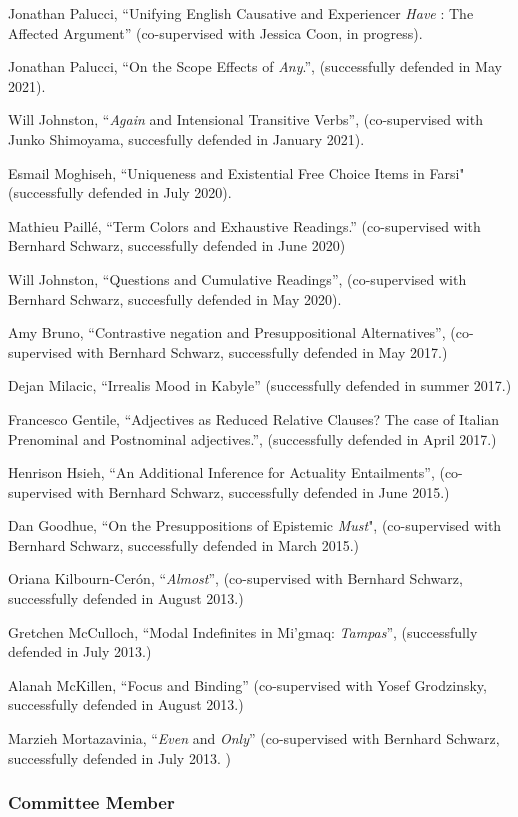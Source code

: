\documentclass[11pt]{article}
\begin{document}
Jonathan Palucci, ``Unifying English Causative and Experiencer \textit{Have} : The Affected Argument'' (co-supervised with Jessica Coon, in progress).

Jonathan Palucci, ``On the Scope Effects of \textit{Any}.'', (successfully defended in May 2021).

Will Johnston, ``\textit{Again} and Intensional Transitive Verbs'', (co-supervised with Junko Shimoyama, succesfully defended in January 2021).

Esmail Moghiseh, ``Uniqueness and Existential Free Choice Items in Farsi" (successfully defended in July 2020).

Mathieu Paill\'e, ``Term Colors and Exhaustive Readings.'' (co-supervised with Bernhard Schwarz, successfully defended in June 2020)

Will Johnston, ``Questions and Cumulative Readings'', (co-supervised with Bernhard Schwarz, succesfully defended in May 2020).

Amy Bruno, ``Contrastive negation and Presuppositional Alternatives'', (co-supervised with Bernhard Schwarz, successfully defended in May 2017.)

Dejan Milacic, ``Irrealis Mood in Kabyle'' (successfully defended in summer 2017.)

Francesco Gentile, ``Adjectives as Reduced Relative Clauses?
The case of Italian Prenominal and Postnominal adjectives.'', (successfully defended in April  2017.)

Henrison Hsieh, ``An Additional Inference for Actuality Entailments'',
(co-supervised with Bernhard Schwarz, successfully defended in June 2015.)

Dan Goodhue, ``On the Presuppositions of Epistemic \textit{Must}", (co-supervised with Bernhard Schwarz, successfully defended in March 2015.)


Oriana Kilbourn-Cer\'on, ``\textit{Almost}'', (co-supervised with Bernhard Schwarz,
successfully defended in August 2013.) 

Gretchen McCulloch, ``Modal Indefinites in Mi'gmaq: \textit{Tampas}'', (successfully defended in July 2013.)

Alanah McKillen, ``Focus and Binding'' (co-supervised with Yosef
Grodzinsky, successfully defended in August 2013.)

Marzieh Mortazavinia, ``\textit{Even} and \textit{Only}''
(co-supervised with Bernhard Schwarz, successfully defended in July
2013. )


\subsubsection*{Committee Member}
\end{document}

